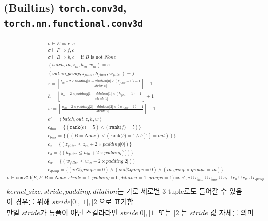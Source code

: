 \documentclass{article}
\newcommand{\x}{\times}
\newcommand{\rem}{\mtt{\%}}
\newcommand{\Rar}{\Rightarrow}
\newcommand{\ttt}[1]{\texttt{#1}}
\newcommand{\mtt}[1]{\mathtt{#1}}
\newcommand{\bigspace}{\,\,\,\,\,\,\,\,}
\newcommand{\op}[2]{\mtt{#1(}#2\mtt{)}}
\newcommand{\ind}[1]{\mtt{[}#1\mtt{]}}
\begin{document}
\subsection*{(Builtins) \ttt{torch.conv3d}, \ttt{torch.nn.functional.conv3d}}
\begin{align*}
  \frac
  {
    \begin{array}{l}
      \sigma \vdash E \Rar e, c \\
      \sigma \vdash F \Rar f, c \\
      \sigma \vdash B \Rar b, c \bigspace \text{if $B$ is not $None$} \\
      (batch, in, z_{in}, h_{in}, w_{in}) = e \\
      (out, in\_group, z_{filter}, h_{filter}, w_{filter}) = f \\
      z = \left\lfloor \frac{z_{in} + 2 \x padding \ind{0} - dilation \ind{0}
        \x (z_{filter} - 1) - 1}{stride \ind{0}} \right\rfloor + 1 \\
      h = \left\lfloor \frac{h_{in} + 2 \x padding \ind{1} - dilation \ind{1}
        \x (h_{filter} - 1) - 1}{stride \ind{1}} \right\rfloor + 1 \\
      w = \left\lfloor \frac{w_{in} + 2 \x padding \ind{2} - dilation \ind{2}
        \x (w_{filter} - 1) - 1}{stride \ind{2}} \right\rfloor + 1 \\
      e' = (batch, out, z, h, w) \\
      c_{dim} = \{ (\op{rank}{e} = 5) \land (\op{rank}{f} = 5) \} \\
      c_{bias} = \{ ((B = None) \lor (\op{rank}{b} = 1 \land b[1] = out)) \} \\
      c_z = \{ (z_{filter} \leq z_{in} + 2 \x padding \ind{0}) \} \\
      c_h = \{ (h_{filter} \leq h_{in} + 2 \x padding \ind{1}) \} \\
      c_w = \{ (w_{filter} \leq w_{in} + 2 \x padding \ind{2}) \} \\
      c_{group} = \{ (in \rem groups = 0) \land (out \rem groups = 0)
        \land (in\_group \x groups = in)\}
    \end{array}
  }
  {
    \sigma \vdash \op{conv2d}{E, F, B=None, stride=1, padding=0,
      dilation=1, groups=1} \Rar e', c \cup c_{dim} \cup c_{bias} \cup c_z 
        \cup c_h \cup c_w \cup c_{group}
  } \\
  \\
  \text{$kernel\_size, stride, padding, dilation$는 가로-세로별 3-tuple로도 들어갈
  수 있음} \\
  \text{이 경우를 위해 $stride\ind{0}, \ind{1}, \ind{2}$으로 표기함} \\
  \text{만일 $stride$가 튜플이 아닌 스칼라라면 $stride\ind{0}, \ind{1}$ 또는 
  $\ind{2}$는 $stride$ 값 자체를 의미}
\end{align*}%
\end{document}
